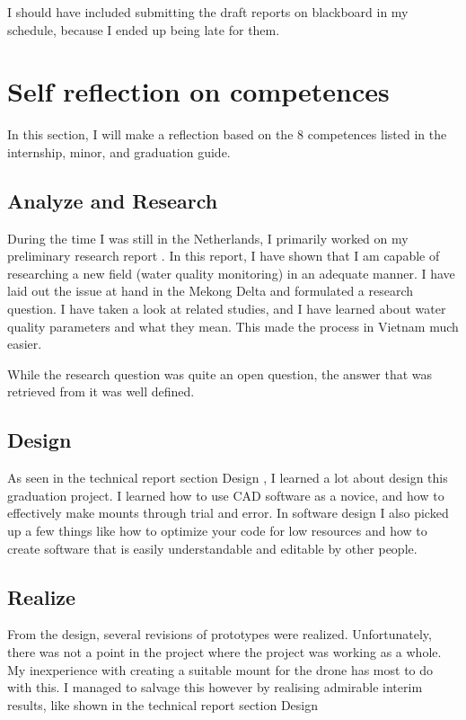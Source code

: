 \documentclass[11pt, a4paper]{article}
\begin{document}
I should have included submitting the draft reports on blackboard in my schedule, because I ended up being late for them.

\newpage
\section{Self reflection on competences}
In this section, I will make a reflection based on the 8 competences listed in the internship, minor, and graduation guide.


\subsection{Analyze and Research}
During the time I was still in the Netherlands, I primarily worked on my preliminary research report \cite{prr}. In this report, I have shown that I am capable of researching a new field (water quality monitoring) in an adequate manner. I have laid out the issue at hand in the Mekong Delta and formulated a research question. I have taken a look at related studies, and I have learned about water quality parameters and what they mean. This made the process in Vietnam much easier.

While the research question was quite an open question, the answer that was retrieved from it was well defined.

\subsection{Design}
As seen in the technical report section Design \cite{tr}, I learned a lot about design this graduation project. I learned how to use CAD software as a novice, and how to effectively make mounts through trial and error. In software design I also picked up a few things like how to optimize your code for low resources and how to create software that is easily understandable and editable by other people.

\subsection{Realize}
From the design, several revisions of prototypes were realized. Unfortunately, there was not a point in the project where the project was working as a whole. My inexperience with creating a suitable mount for the drone has most to do with this. I managed to salvage this however by realising admirable interim results, like shown in the technical report section Design \cite{tr}
\end{document}
